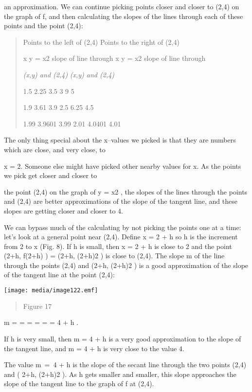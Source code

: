 an approximation. We can continue picking points closer and closer to
(2,4) on the graph of f, and then calculating the slopes of the lines
through each of these points and the point (2,4):

\begin{quote}
Points to the left of (2,4) Points to the right of (2,4)

x y = x2 slope of line through x y = x2 slope of line through

\emph{(x,y) and (2,4)} \emph{(x,y) and (2,4)}

1.5 2.25 3.5 3 9 5

1.9 3.61 3.9 2.5 6.25 4.5

1.99 3.9601 3.99 2.01 4.0401 4.01
\end{quote}

The only thing special about the x--values we picked is that they are
numbers which are close, and very close, to

x = 2. Someone else might have picked other nearby values for x. As the
points we pick get closer and closer to

the point (2,4) on the graph of y = x2 , the slopes of the lines through
the points and (2,4) are better approximations of the slope of the
tangent line, and these slopes are getting closer and closer to 4.

We can bypass much of the calculating by not picking the points one at a
time: let's look at a general point near (2,4). Define x = 2 + h so h is
the increment from 2 to x (Fig. 8). If h is small, then x = 2 + h is
close to 2 and the point (2+h, f(2+h) ) = (2+h, (2+h)2 ) is close to
(2,4). The slope m of the line through the points (2,4) and (2+h, (2+h)2
) is a good approximation of the slope of the tangent line at the point
(2,4):

\texttt{[image: media/image122.emf]}

\begin{quote}
Figure 17
\end{quote}

m = = = = = = 4 + h .

If h is very small, then m = 4 + h is a very good approximation to the
slope of the tangent line, and m = 4 + h is very close to the value 4.

The value m~=~4 + h is the slope of the secant line through the two
points (2,4) and ( 2+h, (2+h)2 ). As h gets smaller and smaller, this
slope approaches the slope of the tangent line to the graph of f at
(2,4).

